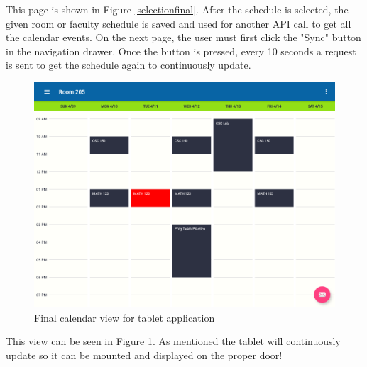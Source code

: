 This page is shown in Figure \ref{selectionfinal}.  After the schedule is selected, the given room or faculty schedule is saved and used for another API call to get all the calendar events.  On the next page, the user must first click the "Sync" button in the navigation drawer.  Once the button is pressed, every 10 seconds a request is sent to get the schedule again to continuously update.  

\begin{figure}
  \includegraphics[scale=0.45]{dashboard_final.png}
  \caption{Final calendar view for tablet application}
  \label{dashboardfinal}
\end{figure}

This view can be seen in Figure \ref{dashboardfinal}. As mentioned the tablet will continuously update so it can be mounted and displayed on the proper door!





